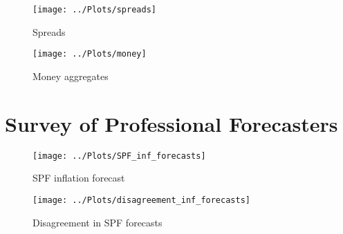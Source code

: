 \documentclass{beamer}
\begin{document}
\begin{frame}
\begin{figure}
	\centering
	\texttt{[image: ../Plots/spreads]}
	\caption{Spreads}
\end{figure}
\end{frame}


\begin{frame}
\begin{figure}
	\centering
	\texttt{[image: ../Plots/money]}
	\caption{Money aggregates}
\end{figure}
\end{frame}

\section{Survey of Professional Forecasters}
\begin{frame}
\begin{figure}
	\centering
	\texttt{[image: ../Plots/SPF\_inf\_forecasts]}
	\caption{SPF inflation forecast}
\end{figure}
\end{frame}


\begin{frame}
\begin{figure}
	\centering
	\texttt{[image: ../Plots/disagreement\_inf\_forecasts]}
	\caption{Disagreement in SPF forecasts}
\end{figure}
\end{frame}
\end{document}
